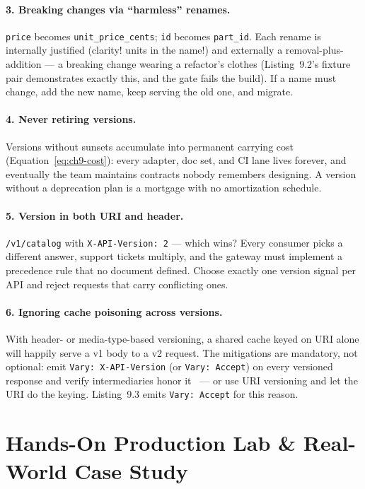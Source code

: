 \paragraph{3. Breaking changes via ``harmless'' renames.}
\texttt{price} becomes \texttt{unit\_price\_cents}; \texttt{id} becomes
\texttt{part\_id}. Each rename is internally justified (clarity! units in the
name!) and externally a removal-plus-addition --- a breaking change wearing a
refactor's clothes (Listing~9.2's fixture pair demonstrates exactly this, and
the gate fails the build). If a name must change, add the new name, keep
serving the old one, and migrate.

\paragraph{4. Never retiring versions.}
Versions without sunsets accumulate into permanent carrying cost
(Equation~\ref{eq:ch9-cost}): every adapter, doc set, and CI lane lives
forever, and eventually the team maintains contracts nobody remembers
designing. A version without a deprecation plan is a mortgage with no
amortization schedule.

\paragraph{5. Version in both URI and header.}
\texttt{/v1/catalog} with \texttt{X-API-Version: 2} --- which wins? Every
consumer picks a different answer, support tickets multiply, and the gateway
must implement a precedence rule that no document defined. Choose exactly one
version signal per API and reject requests that carry conflicting ones.

\paragraph{6. Ignoring cache poisoning across versions.}
With header- or media-type-based versioning, a shared cache keyed on URI
alone will happily serve a v1 body to a v2 request. The mitigations are
mandatory, not optional: emit \texttt{Vary: X-API-Version} (or
\texttt{Vary: Accept}) on every versioned response and verify intermediaries
honor it~\cite{rfc9110} --- or use URI versioning and let the URI do the
keying. Listing~9.3 emits \texttt{Vary: Accept} for this reason.

\section{Hands-On Production Lab \& Real-World Case Study}
\label{sec:ch9-lab}

